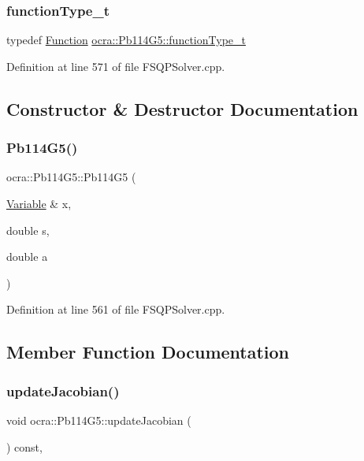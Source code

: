 \subsubsection{\texorpdfstring{function\+Type\+\_\+t}{functionType\_t}}
{\footnotesize\ttfamily typedef \hyperlink{classocra_1_1Function}{Function} \hyperlink{classocra_1_1Pb114G5_af9b5d124dfe6eefc49fe0603b948330e}{ocra\+::\+Pb114\+G5\+::function\+Type\+\_\+t}}



Definition at line 571 of file F\+S\+Q\+P\+Solver.\+cpp.



\subsection{Constructor \& Destructor Documentation}
\hypertarget{classocra_1_1Pb114G5_a53ef7eb76deed9c8ca148f175f9bb8a6}{}\label{classocra_1_1Pb114G5_a53ef7eb76deed9c8ca148f175f9bb8a6} 
\subsubsection{\texorpdfstring{Pb114\+G5()}{Pb114G5()}}
{\footnotesize\ttfamily ocra\+::\+Pb114\+G5\+::\+Pb114\+G5 (\begin{DoxyParamCaption}\item[{\hyperlink{classocra_1_1Variable}{Variable} \&}]{x,  }\item[{double}]{s,  }\item[{double}]{a }\end{DoxyParamCaption})\hspace{0.3cm}{\ttfamily [inline]}}



Definition at line 561 of file F\+S\+Q\+P\+Solver.\+cpp.



\subsection{Member Function Documentation}
\hypertarget{classocra_1_1Pb114G5_a8dc90051ef52688c0879a3d129d5bf84}{}\label{classocra_1_1Pb114G5_a8dc90051ef52688c0879a3d129d5bf84} 
\subsubsection{\texorpdfstring{update\+Jacobian()}{updateJacobian()}}
{\footnotesize\ttfamily void ocra\+::\+Pb114\+G5\+::update\+Jacobian (\begin{DoxyParamCaption}{ }\end{DoxyParamCaption}) const\hspace{0.3cm}{\ttfamily [inline]}, {\ttfamily [protected]}}



